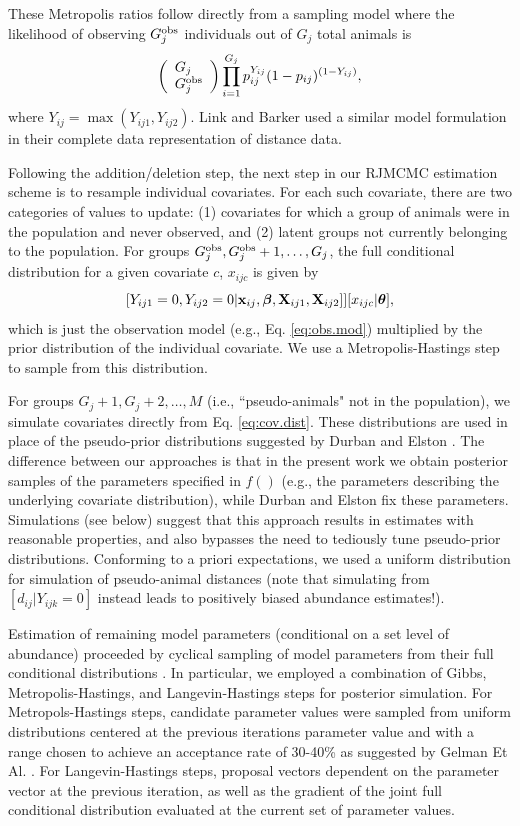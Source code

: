 \documentclass[10pt]{article}
\begin{document}
These Metropolis ratios follow directly from a sampling model where the likelihood of observing $G_j^{\rm obs}$ individuals out of $G_j$ total animals is
$$
\left( \begin{array}{l}
G_j \\
G_j^{\rm obs}
\end{array} \right)
\prod_{i=1}^{G_j} p_{ij}^{Y_{ij}} (1-p_{ij})^{(1-Y_{ij})},
$$
where $Y_{ij}=\max(Y_{ij1},Y_{ij2})$.  Link and Barker \cite{LinkBarker2010} used a similar model formulation in their complete data representation of distance data.

Following the addition/deletion step, the next step in our RJMCMC estimation scheme is to resample individual covariates.  For each such covariate, there are two categories of values to update: (1) covariates for which a group of animals were in the population and never observed, and (2) latent groups not currently belonging to the population. For groups $G_{j}^{\rm obs},G_{j}^{\rm obs}+1,\hdots,G_j$, the full conditional distribution for a given covariate $c$, $x_{ijc}$ is given by
$$
[Y_{ij1}=0,Y_{ij2}=0|{\bf x}_{ij},\boldsymbol{\beta},{\bf X}_{ij1},{\bf X}_{ij2}]][x_{ijc}|\boldsymbol{\theta}],
$$
which is just the observation model (e.g., Eq. \ref{eq:obs.mod}) multiplied by the prior distribution of the individual covariate.  We use a Metropolis-Hastings step to sample from this distribution.

For groups $G_j+1,G_j+2, \hdots,M$ (i.e., ``pseudo-animals" not in the population), we simulate covariates directly from Eq. \ref{eq:cov.dist}.  These distributions are used in place of the pseudo-prior distributions suggested by Durban and Elston \cite{DurbanElston2005}.  The difference between our approaches is that in the present work we obtain posterior samples of the parameters specified in  $f()$ (e.g., the parameters describing the underlying covariate distribution), while Durban and Elston fix these parameters.  Simulations (see below) suggest that this approach results in estimates with reasonable properties, and also bypasses the need to tediously tune pseudo-prior distributions.  Conforming to a priori expectations, we used a uniform distribution for simulation of pseudo-animal distances (note that simulating from $[d_{ij} | Y_{ijk}=0]$ instead leads to positively biased abundance estimates!).

Estimation of remaining model parameters (conditional on a set level of abundance)  proceeded by cyclical sampling of model parameters from their full conditional distributions \cite{GelmanEtAl2004}.  In particular, we employed a combination of Gibbs, Metropolis-Hastings, and Langevin-Hastings \cite{RobertCasella2004} steps for posterior simulation.  For Metropols-Hastings steps, candidate parameter values were sampled from uniform distributions centered at the previous iterations parameter value and with a range chosen to achieve an acceptance rate of 30-40\% as suggested by Gelman Et Al. \cite{GelmanEtAl2004}.  For Langevin-Hastings steps, proposal vectors dependent on the parameter vector at the previous iteration, as well as the gradient of the joint full conditional distribution evaluated at the current set of parameter values.
\end{document}
